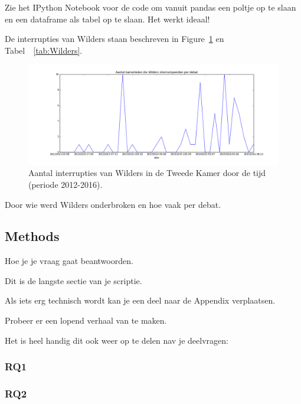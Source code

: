Zie het IPython Notebook voor de code om vanuit pandas een poltje op te slaan en een dataframe als tabel op te slaan. Het werkt ideaal! 

De interrupties van Wilders staan beschreven in Figure~\ref{fig:wilders} en Tabel~~\ref{tab:Wilders}.



\begin{figure}
\begin{center}
\includegraphics[width=\linewidth]{fig/WildersPlot.png}
\caption{\label{fig:wilders} Aantal interrupties van Wilders in de Tweede Kamer door de tijd (periode 2012-2016).}
\end{center}
\end{figure}


\pagebreak

\begin{table}[h]
\begin{footnotesize}

\end{footnotesize}
\caption{\label{tab:Wilders} Door wie werd Wilders onderbroken en hoe vaak per debat.}
\end{table}


\pagebreak
\subsection{Methods}
Hoe je je vraag gaat beantwoorden.


Dit is de langste sectie van je scriptie. 

Als iets erg technisch wordt kan je een deel naar de Appendix verplaatsen. 

Probeer er een lopend verhaal van te maken.

Het is heel handig dit ook weer op te delen nav je deelvragen:

\subsubsection{RQ1}

\subsubsection{RQ2}
